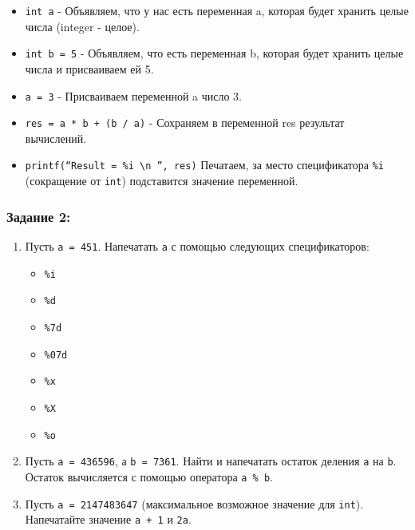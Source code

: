 \documentclass{article}
\begin{document}
\begin{itemize}
\item \texttt{int a} - Объявляем, что у нас есть переменная a, которая будет хранить целые числа (integer - целое).
\item \texttt{int b = 5} - Объявляем, что есть переменная b, которая будет хранить целые числа и присваиваем ей 5.
\item \texttt{a = 3} - Присваиваем переменной a число 3.
\item \texttt{res = a * b + (b / a)} - Сохраняем в переменной res результат вычислений.
\item \texttt{printf(``Result = \%i \textbackslash n '', res)} Печатаем, за место спецификатора \texttt{\%i} (сокращение от \texttt{int}) подставится значение переменной.
\end{itemize}
\subsubsection*{Задание 2:}
\begin{enumerate}
\item Пусть \texttt{a = 451}. Напечатать \texttt{a} с помощью следующих спецификаторов:
\begin{multicols}{3}
	\begin{itemize}
	\item \texttt{\%i}
	\item \texttt{\%d}
	\item \texttt{\%7d}
	\item \texttt{\%07d}
	\item \texttt{\%x}
	\item \texttt{\%X}
	\item \texttt{\%o}
	\end{itemize}
\end{multicols}
\item Пусть \texttt{a = 436596}, а \texttt{b = 7361}. Найти и напечатать остаток деления \texttt{a} на \texttt{b}. Остаток вычисляется с помощью оператора \texttt{a \% b}.
\item Пусть \texttt{a = 2147483647} (максимальное возможное значение для \texttt{int}). Напечатайте значение \texttt{a + 1} и \texttt{2a}.

\end{enumerate}
\end{document}
